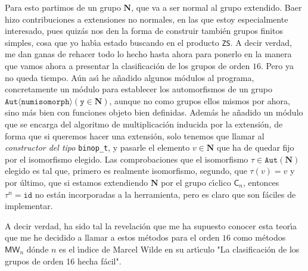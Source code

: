 \documentclass[final,12pt,a4paper,twoside,fleqn]{extbook}
\newcommand{\grN}{\ensuremath{\mathbf{N}}}
\newcommand{\grclass}[1]{\ensuremath{\mathsf{#1}}}
\newcommand{\cyclicgr}[1]{\ensuremath{{\grclass{C}}_{#1}}}
\theoremstyle{definition}
\theoremstyle{remark}
\begin{document}
Para esto partimos de un grupo $\grN$, que va a ser normal al grupo extendido. Baer hizo
contribuciones a extensiones no normales, en las que estoy especialmente interesado, pues
quiz\'as nos den la forma de construir también grupos finitos simples, cosa que yo hab{\'\i}a
estado buscando en el producto \texttt{ZS}. A decir verdad, me dan ganas de rehacer todo lo hecho
hasta ahora para ponerlo en la manera que vamos ahora a presentar la clasificaci\'on de los grupos
de orden $16$. Pero ya no queda tiempo. A\'un as{\'\i} he añadido algunos m\'odulos al programa,
concretamente un m\'odulo para establecer los automorfismos de un grupo
$\mathtt{Aut\langle num isomorph\rangle(y         \in \grN)}$,
aunque no como grupos ellos mismos por ahora, sino m\'as bien con funciones objeto bien definidas.
Adem\'as he añadido un m\'odulo que se encarga del algoritmo de multiplicaci\'on inducida por la
extensi\'on, de forma que si queremos hacer una extensi\'on, solo tenemos que llamar al
\emph{constructor del tipo} \texttt{binop\_t}, y pasarle el elemento $v         \in \grN$ que ha
de quedar fijo por el isomorfismo elegido. Las comprobaciones que el isomorfismo
$\tau         \in \mathtt{Aut\left({\grN}\right)}$ elegido es tal que, primero es realmente isomorfismo,
segundo, que $\tau \left({v}\right)=v$ y por \'ultimo, que si estamos extendiendo $\grN$ por el
grupo c{\'\i}clico $\cyclicgr{n}$, entonces ${\tau }^{n}=\mathtt{id}$ no est\'an incorporadas a
la herramienta, pero es claro que son f\'aciles de implementar.

A decir verdad, ha sido tal la revelaci\'on que me ha supuesto conocer esta teor{\'\i}a que me
he decidido a llamar a estos m\'etodos para el orden $16$ como m\'etodos ${\textsf{MW}}_{n}$
d\'onde $n$ es el {\'\i}ndice de Marcel Wilde en su art{\'\i}culo "La clasificaci\'on de los grupos
de orden 16 hecha f\'acil".
\end{document}
